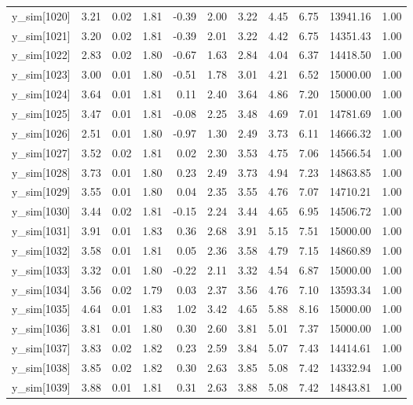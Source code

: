 \begin{table}[ht]
\begin{tabular}{rrrrrrrrrrr}
  y\_sim[1020] & 3.21 & 0.02 & 1.81 & -0.39 & 2.00 & 3.22 & 4.45 & 6.75 & 13941.16 & 1.00 \\ 
  y\_sim[1021] & 3.20 & 0.02 & 1.81 & -0.39 & 2.01 & 3.22 & 4.42 & 6.75 & 14351.43 & 1.00 \\ 
  y\_sim[1022] & 2.83 & 0.02 & 1.80 & -0.67 & 1.63 & 2.84 & 4.04 & 6.37 & 14418.50 & 1.00 \\ 
  y\_sim[1023] & 3.00 & 0.01 & 1.80 & -0.51 & 1.78 & 3.01 & 4.21 & 6.52 & 15000.00 & 1.00 \\ 
  y\_sim[1024] & 3.64 & 0.01 & 1.81 & 0.11 & 2.40 & 3.64 & 4.86 & 7.20 & 15000.00 & 1.00 \\ 
  y\_sim[1025] & 3.47 & 0.01 & 1.81 & -0.08 & 2.25 & 3.48 & 4.69 & 7.01 & 14781.69 & 1.00 \\ 
  y\_sim[1026] & 2.51 & 0.01 & 1.80 & -0.97 & 1.30 & 2.49 & 3.73 & 6.11 & 14666.32 & 1.00 \\ 
  y\_sim[1027] & 3.52 & 0.02 & 1.81 & 0.02 & 2.30 & 3.53 & 4.75 & 7.06 & 14566.54 & 1.00 \\ 
  y\_sim[1028] & 3.73 & 0.01 & 1.80 & 0.23 & 2.49 & 3.73 & 4.94 & 7.23 & 14863.85 & 1.00 \\ 
  y\_sim[1029] & 3.55 & 0.01 & 1.80 & 0.04 & 2.35 & 3.55 & 4.76 & 7.07 & 14710.21 & 1.00 \\ 
  y\_sim[1030] & 3.44 & 0.02 & 1.81 & -0.15 & 2.24 & 3.44 & 4.65 & 6.95 & 14506.72 & 1.00 \\ 
  y\_sim[1031] & 3.91 & 0.01 & 1.83 & 0.36 & 2.68 & 3.91 & 5.15 & 7.51 & 15000.00 & 1.00 \\ 
  y\_sim[1032] & 3.58 & 0.01 & 1.81 & 0.05 & 2.36 & 3.58 & 4.79 & 7.15 & 14860.89 & 1.00 \\ 
  y\_sim[1033] & 3.32 & 0.01 & 1.80 & -0.22 & 2.11 & 3.32 & 4.54 & 6.87 & 15000.00 & 1.00 \\ 
  y\_sim[1034] & 3.56 & 0.02 & 1.79 & 0.03 & 2.37 & 3.56 & 4.76 & 7.10 & 13593.34 & 1.00 \\ 
  y\_sim[1035] & 4.64 & 0.01 & 1.83 & 1.02 & 3.42 & 4.65 & 5.88 & 8.16 & 15000.00 & 1.00 \\ 
  y\_sim[1036] & 3.81 & 0.01 & 1.80 & 0.30 & 2.60 & 3.81 & 5.01 & 7.37 & 15000.00 & 1.00 \\ 
  y\_sim[1037] & 3.83 & 0.02 & 1.82 & 0.23 & 2.59 & 3.84 & 5.07 & 7.43 & 14414.61 & 1.00 \\ 
  y\_sim[1038] & 3.85 & 0.02 & 1.82 & 0.30 & 2.63 & 3.85 & 5.08 & 7.42 & 14332.94 & 1.00 \\ 
  y\_sim[1039] & 3.88 & 0.01 & 1.81 & 0.31 & 2.63 & 3.88 & 5.08 & 7.42 & 14843.81 & 1.00 \\ 

\end{tabular}
\end{table}
